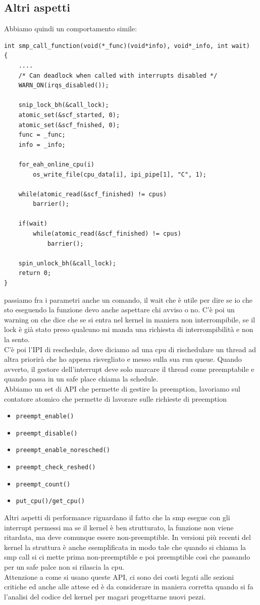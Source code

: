 \documentclass[12pt, oneside]{extbook}
\begin{document}
\subsection{Altri aspetti}
Abbiamo quindi un comportamento simile:
\begin{lstlisting}
int smp_call_function(void(*_func)(void*info), void*_info, int wait)
{
	....
	/* Can deadlock when called with interrupts disabled */
	WARN_ON(irqs_disabled());
	
	snip_lock_bh(&call_lock);
	atomic_set(&scf_started, 0);
	atomic_set(&scf_fnished, 0);
	func = _func;
	info = _info;
	
	for_eah_online_cpu(i)
		os_write_file(cpu_data[i], ipi_pipe[1], "C", 1);
		
	while(atomic_read(&scf_finished) != cpus)
		barrier();
	
	if(wait)
		while(atomic_read(&scf_finished) != cpus)
			barrier();
	
	spin_unlock_bh(&call_lock);
	return 0;
}
\end{lstlisting}
passiamo fra i parametri anche un comando, il wait che è utile per dire se io che sto eseguendo la funzione devo anche aspettare chi avviso o no. C'è poi un warning on che dice che se si entra nel kernel in maniera non interrompibile, se il lock è già stato preso qualcuno mi manda una richiesta di interrompibilità e non la sento.\\ C'è poi l'IPI di reschedule, dove diciamo ad una cpu di rischedulare un thread ad altra priorirà che ho appena risvegliato e messo sulla sua run queue. Quando avverto, il gestore dell'interrupt deve solo marcare il thread come preemptabile e quando passa in un safe place chiama la schedule.\\Abbiamo un set di API che permette di gestire la preemption, lavoriamo sul contatore atomico che permette di lavorare sulle richieste di preemption 
\begin{itemize}
	\item \texttt{preempt\_enable()}
	\item \texttt{preempt\_disable()}
	\item \texttt{preempt\_enable\_noresched()}
	\item \texttt{preempt\_check\_reshed()}
	\item \texttt{preempt\_count()}
	\item \texttt{put\_cpu()/get\_cpu()}
\end{itemize}
Altri aspetti di performance riguardano il fatto che la smp esegue con gli interrupt permessi ma se il kernel è ben strutturato, la funzione non viene ritardata, ma deve comunque essere non-preemptible. In versioni più recenti del kernel la struttura è anche esemplificata in modo tale che quando si chiama la smp call si ci mette prima non-preemptible e poi preemptible così che passando per un safe palce non si rilascia la cpu.\\Attenzione a come si usano queste API, ci sono dei costi legati alle sezioni critiche ed anche alle attese ed è da considerare in maniera corretta quando si fa l'analisi del codice del kernel per magari progettarne nuovi pezzi.
\end{document}
